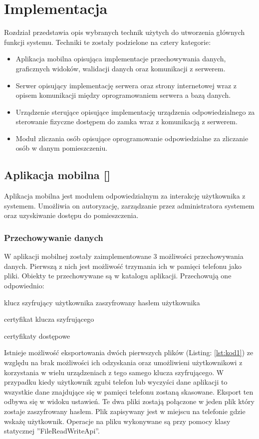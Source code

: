 \newpage\section{Implementacja} \label{sec:implementacja}
Rozdział przedstawia opis wybranych technik użytych do utworzenia głównych funkcji systemu. Techniki te zostały podzielone na cztery kategorie:
\begin{itemize}
	\item Aplikacja mobilna opisująca implementacje przechowywania danych, graficznych widoków, walidacji danych oraz komunikacji z serwerem. 
	\item Serwer opisujący implementację serwera  oraz strony internetowej wraz z opisem komunikacji między oprogramowaniem serwera a bazą danych.
	
	\item  Urządzenie sterujące opisujące implementację urządzenia odpowiedzialnego za sterowanie fizyczne dostępem do zamka wraz z komunikacją z serwerem.
	
	\item Moduł zliczania osób opisujące oprogramowanie odpowiedzialne za zliczanie osób w danym pomieszczeniu. 
\end{itemize} 
\subsection[Aplikacja mobilna]{Aplikacja mobilna [\StudentB]}
 Aplikacja mobilna jest  modułem odpowiedzialnym za interakcję użytkownika z systemem. Umożliwia on autoryzację, zarządzanie przez administratora systemem oraz uzyskiwanie dostępu do pomieszczenia.
	\subsubsection{Przechowywanie danych}
	W aplikacji mobilnej zostały zaimplementowane 3 możliwości przechowywania danych. Pierwszą z nich jest możliwość trzymania ich w pamięci telefonu jako pliki. Obiekty te przechowywane są w katalogu aplikacji. Przechowują one odpowiednio:
	\begin{itemize*}
	\item	klucz szyfrujący użytkownika zaszyfrowany hasłem użytkownika
	\item certyfikat klucza szyfrującego 
	\item certyfikaty dostępowe
	\end{itemize*}	
	Istnieje możliwość eksportowania dwóch pierwszych plików (Listing: \ref{lst:kod1}) ze względu na brak możliwości ich odzyskania oraz umożliwieni użytkownikowi z korzystania w wielu urządzeniach z tego samego klucza szyfrującego. W przypadku kiedy użytkownik zgubi telefon lub  wyczyści dane aplikacji to wszystkie dane znajdujące się w pamięci telefonu zostaną skasowane. Eksport ten odbywa się w widoku ustawień. Te dwa pliki zostają połączone w jeden plik który zostaje zaszyfrowany hasłem. Plik zapisywany jest w miejscu na telefonie gdzie wskażę użytkownik.  Operacje na pliku wykonywane są przy pomocy klasy statycznej ''FileReadWriteApi''.
	
